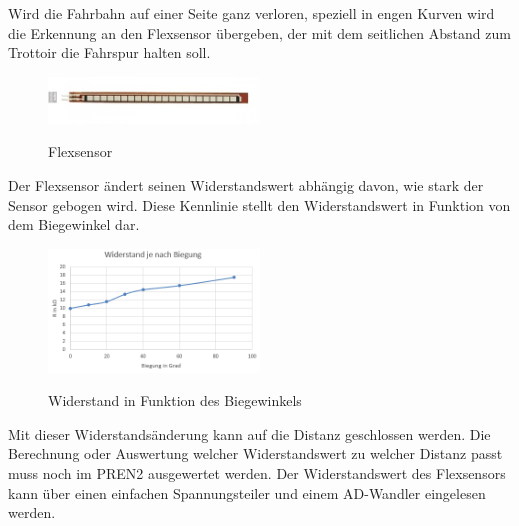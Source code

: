Wird die Fahrbahn auf einer Seite ganz verloren, speziell in engen Kurven wird die Erkennung an den Flexsensor übergeben, der mit dem seitlichen Abstand zum Trottoir die Fahrspur halten soll.

\begin{figure}[h]
	\centering
	\includegraphics[width=0.5\textwidth]{03_Loesungskonzept/pictures/Flexsensor.jpg}
	\label{fig:Flexsensor}
	\caption{Flexsensor}
\end{figure}

Der Flexsensor ändert seinen Widerstandswert abhängig davon, wie stark der Sensor gebogen wird. 
Diese Kennlinie stellt den Widerstandswert in Funktion von dem Biegewinkel dar.

\begin{figure}[h]
	\centering
	\includegraphics[width=0.5\textwidth]{03_Loesungskonzept/pictures/Flex_Biegungskennline.png}
	\label{fig:Flex_R_Kennlinie}
	\caption{Widerstand in Funktion des Biegewinkels}
\end{figure}

Mit dieser Widerstandsänderung kann auf die Distanz geschlossen werden. Die Berechnung oder Auswertung welcher Widerstandswert zu welcher Distanz passt muss noch im PREN2 ausgewertet werden. Der Widerstandswert des Flexsensors kann über einen einfachen Spannungsteiler und einem AD-Wandler eingelesen werden.